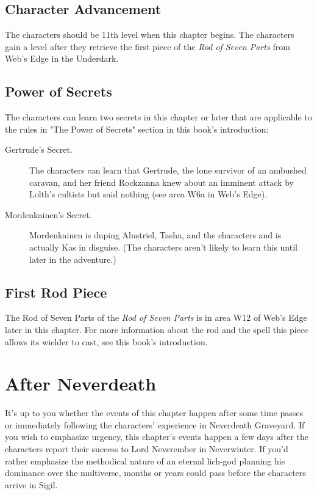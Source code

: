 \documentclass[10pt,a4paper,twoside,bg=print,twocolumn,openany,nodeprecatedcode]{dndbook}
\begin{document}
\subsection{Character Advancement}
The characters should be 11th level when this chapter begins. The characters gain a level after they retrieve the first piece of the \textit{Rod of Seven Parts} from Web's Edge in the Underdark.

\subsection{Power of Secrets}
The characters can learn two secrets in this chapter or later that are applicable to the rules in "The Power of Secrets" section in this book's introduction:


\begin{description}
\item[Gertrude's Secret.]
The characters can learn that Gertrude, the lone survivor of an ambushed caravan, and her friend Rockzanna knew about an imminent attack by Lolth's cultists but said nothing (see area W6a in Web's Edge).
\item[Mordenkainen's Secret.]
Mordenkainen is duping Alustriel, Tasha, and the characters and is actually Kas in disguise. (The characters aren't likely to learn this until later in the adventure.)
\end{description}

\subsection{First Rod Piece}
The Rod of Seven Parts of the \textit{Rod of Seven Parts} is in area W12 of Web's Edge later in this chapter. For more information about the rod and the spell this piece allows its wielder to cast, see this book's introduction.

\section{After Neverdeath}
It's up to you whether the events of this chapter happen after some time passes or immediately following the characters' experience in Neverdeath Graveyard. If you wish to emphasize urgency, this chapter's events happen a few days after the characters report their success to Lord Neverember in Neverwinter. If you'd rather emphasize the methodical nature of an eternal lich-god planning his dominance over the multiverse, months or years could pass before the characters arrive in Sigil.
\end{document}
